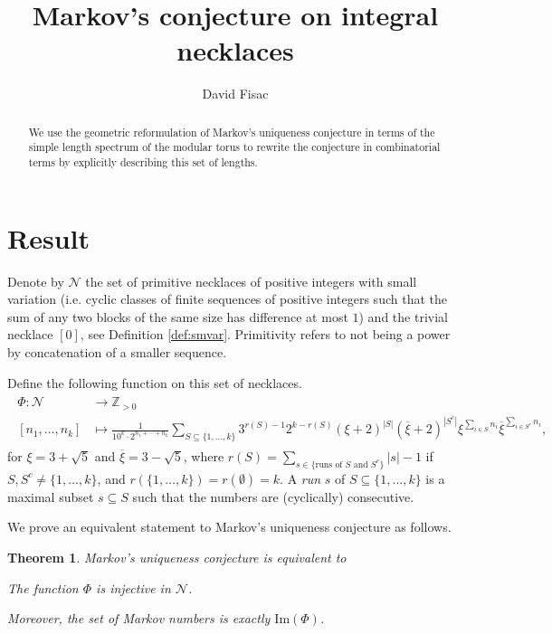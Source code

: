 \documentclass[12pt,reqno]{amsart}
\title[Markov's conjecture on integral necklaces]{Markov's conjecture on integral necklaces}
\author{David Fisac}
\numberwithin{equation}{part}
\theoremstyle{plain}
\newtheorem{theorem}{Theorem}[part]
\theoremstyle{definition}
\begin{document}

\begin{abstract}
 We use the geometric reformulation of Markov's uniqueness conjecture in terms of the simple length spectrum of the modular torus to rewrite the conjecture in combinatorial terms by explicitly describing this set of lengths.\vspace{-30pt}
\end{abstract}


\maketitle

\part{Result}
\vspace{-10pt}
Denote by $\mathcal{N}$ the set of primitive necklaces of positive integers with small variation (i.e. cyclic classes of finite sequences of positive integers such that the sum of any two blocks of the same size has difference at most $1$) and the trivial necklace $[0]$, see Definition \ref{def:smvar}. Primitivity refers to not being a power by concatenation of a smaller sequence.

Define the following function on this set of necklaces. 
\begin{align} \label{eq:Phi}
\begin{split}
\Phi:\mathcal{N}&\to \mathbb{Z}_{>0}\\
[n_1,\hdots, n_k]&\mapsto\frac{1}{10^k\cdot 2^{n_1+\cdots +n_k}}\sum_{S\subseteq\{1,\hdots,k\}}3^{r(S)-1}2^{k-r(S)}(\xi+2)^{|S|}(\overline\xi+2)^{|S^c|}\xi^{\sum_{i\in S}n_i}\overline\xi^{\sum_{i\in S^c}n_i},
\end{split}
\end{align}
for $\xi=3+\sqrt{5}$ and $\overline\xi =3-\sqrt{5}$, where $r(S)=\sum_{s\in\{\text{runs of }S\text{ and }S^c\}}|s|-1$ if $S, S^c\neq \{1,\hdots, k\}$, and $r(\{1,\hdots, k\})=r(\emptyset)=k$. A \emph{run} $s$ of $S\subseteq \{1,\hdots, k\}$ is a maximal subset $s\subseteq S$ such that the numbers are (cyclically) consecutive.

We prove an equivalent statement to Markov's uniqueness conjecture as follows. 

\begin{theorem}\label{mainthm} Markov's uniqueness conjecture is equivalent to 

\begin{center}\textit{The function $\Phi$ is injective in $\mathcal{N}$.}\end{center}
Moreover, the set of Markov numbers is exactly $\mathrm{Im}(\Phi)$.
\end{theorem}
\end{document}
